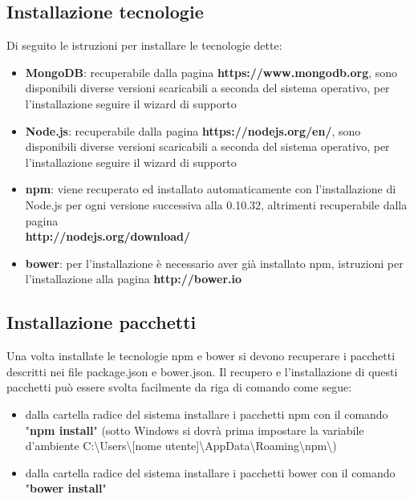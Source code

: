 \subsection{Installazione tecnologie}
Di seguito le istruzioni per installare le tecnologie dette:
\begin{itemize}
\item \textbf{MongoDB}: recuperabile dalla pagina \textbf{https://www.mongodb.org}, sono disponibili diverse versioni scaricabili a seconda del sistema operativo, per l'installazione seguire il wizard di supporto
\item \textbf{Node.js}: recuperabile dalla pagina \textbf{https://nodejs.org/en/}, sono disponibili diverse versioni scaricabili a seconda del sistema operativo, per l'installazione seguire il wizard di supporto
\item \textbf{npm}: viene recuperato ed installato automaticamente con l'installazione di Node.js per ogni versione successiva alla 0.10.32, altrimenti recuperabile dalla pagina \\ \textbf{http://nodejs.org/download/}
\item \textbf{bower}: per l'installazione \`{e} necessario aver gi\`{a} installato npm, istruzioni per l'installazione alla pagina \textbf{http://bower.io}
\end{itemize}

\subsection{Installazione pacchetti}
Una volta installate le tecnologie npm e bower si devono recuperare i pacchetti descritti nei file package.json e bower.json.
Il recupero e l'installazione di questi pacchetti pu\`{o} essere svolta facilmente da riga di comando come segue:
\begin{itemize}
\item dalla cartella radice del sistema installare i pacchetti npm con il comando "\textbf{npm install}" (sotto Windows si dovr\`{a} prima impostare la variabile d'ambiente C:\textbackslash Users\textbackslash[nome utente]\textbackslash AppData\textbackslash Roaming\textbackslash npm\textbackslash)
\item dalla cartella radice del sistema installare i pacchetti bower con il comando "\textbf{bower install}"
\end{itemize}

